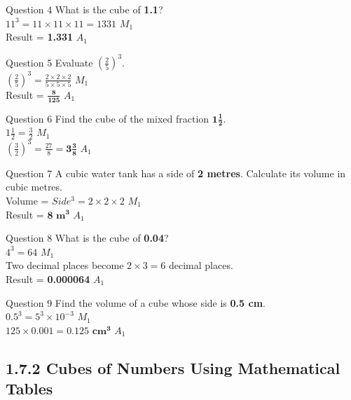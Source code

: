 \documentclass[12pt, a4paper, oneside]{article}
\begin{document}
\begin{solvingbox}{Question 4}
What is the cube of \textbf{1.1}? \\
$11^3 = 11 \times 11 \times 11 = 1331$ \hfill $M_1$ \\
Result = \textbf{1.331} \hfill $A_1$
\end{solvingbox}

\begin{solvingbox}{Question 5}
Evaluate $(\frac{2}{5})^3$. \\
$(\frac{2}{5})^3 = \frac{2 \times 2 \times 2}{5 \times 5 \times 5}$ \hfill $M_1$ \\
Result = $\mathbf{\frac{8}{125}}$ \hfill $A_1$
\end{solvingbox}

\begin{solvingbox}{Question 6}
Find the cube of the mixed fraction $\mathbf{1\frac{1}{2}}$. \\
$1\frac{1}{2} = \frac{3}{2}$ \hfill $M_1$ \\
$(\frac{3}{2})^3 = \frac{27}{8} = \mathbf{3\frac{3}{8}}$ \hfill $A_1$
\end{solvingbox}

\begin{solvingbox}{Question 7}
A cubic water tank has a side of \textbf{2 metres}. Calculate its volume in cubic metres. \\
Volume = $Side^3 = 2 \times 2 \times 2$ \hfill $M_1$ \\
Result = $\mathbf{8\text{ m}^3}$ \hfill $A_1$
\end{solvingbox}

\begin{solvingbox}{Question 8}
What is the cube of \textbf{0.04}? \\
$4^3 = 64$ \hfill $M_1$ \\
Two decimal places become $2 \times 3 = 6$ decimal places. \\
Result = \textbf{0.000064} \hfill $A_1$
\end{solvingbox}

\begin{solvingbox}{Question 9}
Find the volume of a cube whose side is \textbf{0.5 cm}. \\
$0.5^3 = 5^3 \times 10^{-3}$ \hfill $M_1$ \\
$125 \times 0.001 = \mathbf{0.125\text{ cm}^3}$ \hfill $A_1$
\end{solvingbox}

\subsection*{1.7.2 Cubes of Numbers Using Mathematical Tables}
\end{document}
